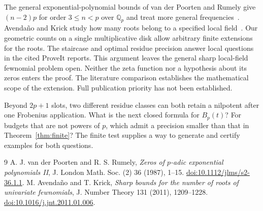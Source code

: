 \documentclass[11pt,letterpaper]{article}
\newcommand{\Q}{\mathbb Q}\newcommand{\Z}{\mathbb Z}\newcommand{\F}{\mathbb F}
\begin{document}
The general exponential-polynomial bounds of van der Poorten and Rumely give $(n-2)p$ for order $3\le n<p$ over $\Q_p$ and treat more general frequencies~\cite{vdr}. Avenda\~no and Krick study how many roots belong to a specified local field~\cite{ak}. Our geometric counts on a single multiplicative disk allow arbitrary finite extensions for the roots. The staircase and optimal residue precision answer local questions in the cited ProveIt reports. This argument leaves the general sharp local-field fewnomial problem open. Neither the zeta function nor a hypothesis about its zeros enters the proof. The literature comparison establishes the mathematical scope of the extension. Full publication priority has not been established.

Beyond $2p+1$ slots, two different residue classes can both retain a nilpotent after one Frobenius application. What is the next closed formula for $B_p(t)$? For budgets that are not powers of $p$, which admit a precision smaller than that in Theorem~\ref{thm:finite}? The finite test supplies a way to generate and certify examples for both questions.

\begin{thebibliography}{9}
 A. J. van der Poorten and R. S. Rumely,
\emph{Zeros of $p$-adic exponential polynomials II},
J. London Math. Soc. (2) 36 (1987), 1--15.
\href{https://doi.org/10.1112/jlms/s2-36.1.1}{doi:10.1112/jlms/s2-36.1.1}.
 M. Avenda\~no and T. Krick,
\emph{Sharp bounds for the number of roots of univariate fewnomials},
J. Number Theory 131 (2011), 1209--1228.
\href{https://doi.org/10.1016/j.jnt.2011.01.006}{doi:10.1016/j.jnt.2011.01.006}.
\end{thebibliography}
\end{document}
